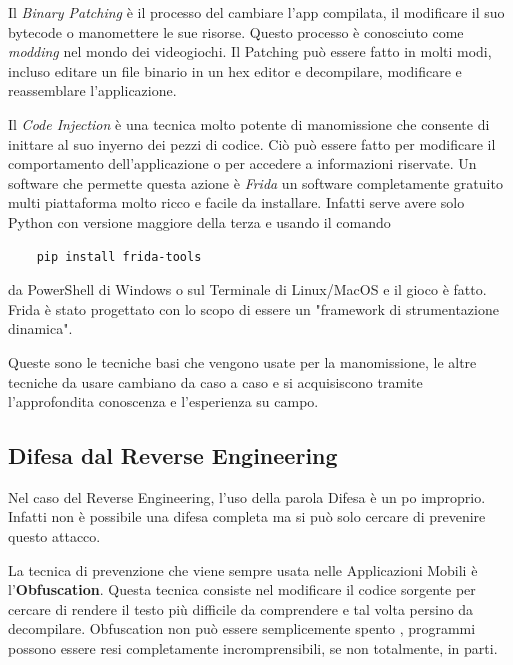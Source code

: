 \documentclass{article}
\begin{document}
Il \textit{Binary Patching} è il processo del cambiare l'app compilata, il modificare il suo bytecode o manomettere le sue risorse. Questo processo è conosciuto come \textit{modding} 
nel mondo dei videogiochi. Il Patching può essere fatto in molti modi, incluso editare un file binario in un hex editor e decompilare, modificare e reassemblare l'applicazione.

Il \textit{Code Injection} è una tecnica molto potente di manomissione che consente di inittare al suo inyerno dei pezzi di codice. 
Ciò può essere fatto per modificare il comportamento dell’applicazione o per accedere a informazioni riservate. Un software che permette questa azione è \textit{Frida}\cite{frida} un software completamente 
gratuito multi piattaforma molto ricco e facile da installare. Infatti serve avere solo Python con versione maggiore della terza e usando il comando 
\begin{verbatim}
    pip install frida-tools
\end{verbatim}
da PowerShell di Windows o sul Terminale di Linux/MacOS e il gioco è fatto. Frida è stato progettato con lo scopo di essere un "framework di strumentazione dinamica".

Queste sono le tecniche basi che vengono usate per la manomissione, le altre tecniche da usare cambiano da caso a caso e si acquisiscono tramite l'approfondita conoscenza e l'esperienza su campo.

\subsection{Difesa dal Reverse Engineering}
Nel caso del Reverse Engineering, l'uso della parola Difesa è un po improprio. Infatti non è possibile una difesa completa ma si può solo cercare di prevenire questo attacco.

La tecnica di prevenzione che viene sempre usata nelle Applicazioni Mobili è l'\textbf{Obfuscation}. Questa tecnica consiste nel modificare il codice sorgente per cercare di rendere il testo 
più difficile da comprendere e tal volta persino da decompilare. Obfuscation non può essere semplicemente spento , programmi possono essere resi completamente incromprensibili, 
se non totalmente, in parti.
\end{document}
